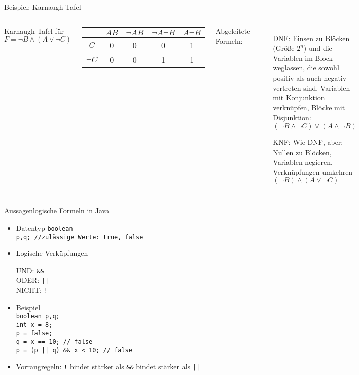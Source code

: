 \begin{frame}{Beispiel: Karnaugh-Tafel}
	\begin{columns}
	Karnaugh-Tafel für $F=\neg B \land (A \lor \neg C)$
	\begin{center}
		\begin{tabular}{|c||c|c|c|c|}
			\hline
			& $AB$ & $\neg A B$ & $\neg A \neg B$ & $A \neg B$ \\
			\hline
			\hline
			$C$ & 0 & 0 & 0 & 1 \\
			\hline
			$\neg C$ & 0 & 0 & 1 & 1 \\
			\hline
		\end{tabular}
	\end{center}
	Abgeleitete Formeln:
	\begin{itemize}
		\item [DNF:] Einsen zu Blöcken (Größe $2^n$) und die Variablen im Block weglassen, die sowohl positiv als auch negativ vertreten sind. Variablen mit Konjunktion verknüpfen, Blöcke mit Disjunktion:\\
		$(\neg B \land \neg C) \lor (A \land \neg B)$
		\item [KNF:] Wie DNF, aber: Nullen zu Blöcken, Variablen negieren, Verknüpfungen umkehren\\
		$(\neg B) \land (A \lor \neg C)$
	\end{itemize}
	\end{columns}
\end{frame}

\begin{frame}{Aussagenlogische Formeln in Java}
	\begin{itemize}
		\item Datentyp \texttt{boolean}\\
		\texttt{p,q; //zulässige Werte: true, false}
		\item Logische Verküpfungen\\
		\begin{tabbing}
			UND: \quad \= \texttt{\&\&}\\
			ODER: \> \texttt{||}\\
			NICHT: \> \texttt{!}
		\end{tabbing}
		\item Beispiel \\
			\texttt{boolean p,q;}\\
			\texttt{int x = 8;}\\
			\texttt{p = false;}\\
			\texttt{q = x == 10; // false}\\
			\texttt{p = (p || q) \&\& x < 10; //  false}
		\item Vorrangregeln: \texttt{!} bindet stärker als \texttt{\&\&} bindet stärker als \texttt{||}
	\end{itemize}
\end{frame}

